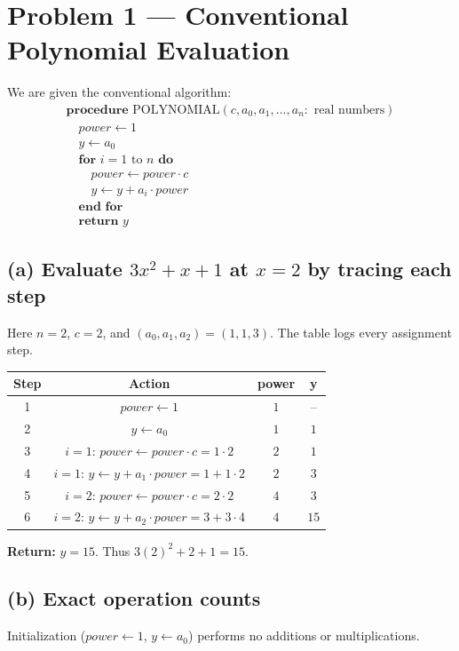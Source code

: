 \section*{Problem 1 — Conventional Polynomial Evaluation}

We are given the conventional algorithm:
\begin{align*}
\textbf{procedure } \mathrm{POLYNOMIAL}(c, a_0, a_1, \ldots, a_n : \text{ real numbers}) \\
\quad power \leftarrow 1 \\
\quad y \leftarrow a_0 \\
\quad \textbf{for } i = 1 \text{ to } n \textbf{ do} \\
\qquad power \leftarrow power \cdot c \\
\qquad y \leftarrow y + a_i \cdot power \\
\quad \textbf{end for} \\
\quad \textbf{return } y
\end{align*}

\subsection*{(a) Evaluate $3x^2 + x + 1$ at $x=2$ by tracing each step}
Here $n=2$, $c=2$, and $(a_0,a_1,a_2)=(1,1,3)$. The table logs every assignment step.

\begin{center}
\begin{tabular}{c|c|c|c}
\textbf{Step} & \textbf{Action} & \textbf{power} & \textbf{y} \\
\hline
1 & $power \leftarrow 1$ & $1$ & -- \\
2 & $y \leftarrow a_0$ & $1$ & $1$ \\
\hline
3 & $i=1$: $power \leftarrow power\cdot c = 1\cdot 2$ & $2$ & $1$ \\
4 & $i=1$: $y \leftarrow y + a_1\cdot power = 1 + 1\cdot 2$ & $2$ & $3$ \\
\hline
5 & $i=2$: $power \leftarrow power\cdot c = 2\cdot 2$ & $4$ & $3$ \\
6 & $i=2$: $y \leftarrow y + a_2\cdot power = 3 + 3\cdot 4$ & $4$ & $15$ \\
\end{tabular}
\end{center}

\noindent\textbf{Return: } $y=15$. Thus $3(2)^2 + 2 + 1 = 15$.

\subsection*{(b) Exact operation counts}
Initialization ($power\leftarrow 1$, $y\leftarrow a_0$) performs no additions or multiplications.

